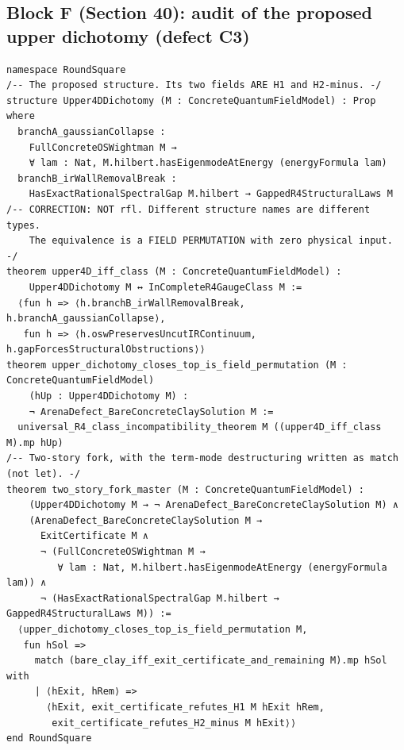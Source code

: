 \documentclass[11pt,a4paper]{article}
\theoremstyle{plain}
\theoremstyle{definition}
\theoremstyle{remark}
\renewcommand{\_}{\oldunderscore\allowbreak}
\begin{document}
\subsection{Block F (Section 40): audit of the proposed upper dichotomy (defect C3)}
\begin{lstlisting}
namespace RoundSquare
/-- The proposed structure. Its two fields ARE H1 and H2-minus. -/
structure Upper4DDichotomy (M : ConcreteQuantumFieldModel) : Prop where
  branchA_gaussianCollapse :
    FullConcreteOSWightman M →
    ∀ lam : Nat, M.hilbert.hasEigenmodeAtEnergy (energyFormula lam)
  branchB_irWallRemovalBreak :
    HasExactRationalSpectralGap M.hilbert → GappedR4StructuralLaws M
/-- CORRECTION: NOT rfl. Different structure names are different types.
    The equivalence is a FIELD PERMUTATION with zero physical input. -/
theorem upper4D_iff_class (M : ConcreteQuantumFieldModel) :
    Upper4DDichotomy M ↔ InCompleteR4GaugeClass M :=
  ⟨fun h => ⟨h.branchB_irWallRemovalBreak, h.branchA_gaussianCollapse⟩,
   fun h => ⟨h.oswPreservesUncutIRContinuum, h.gapForcesStructuralObstructions⟩⟩
theorem upper_dichotomy_closes_top_is_field_permutation (M : ConcreteQuantumFieldModel)
    (hUp : Upper4DDichotomy M) :
    ¬ ArenaDefect_BareConcreteClaySolution M :=
  universal_R4_class_incompatibility_theorem M ((upper4D_iff_class M).mp hUp)
/-- Two-story fork, with the term-mode destructuring written as match (not let). -/
theorem two_story_fork_master (M : ConcreteQuantumFieldModel) :
    (Upper4DDichotomy M → ¬ ArenaDefect_BareConcreteClaySolution M) ∧
    (ArenaDefect_BareConcreteClaySolution M →
      ExitCertificate M ∧
      ¬ (FullConcreteOSWightman M →
         ∀ lam : Nat, M.hilbert.hasEigenmodeAtEnergy (energyFormula lam)) ∧
      ¬ (HasExactRationalSpectralGap M.hilbert → GappedR4StructuralLaws M)) :=
  ⟨upper_dichotomy_closes_top_is_field_permutation M,
   fun hSol =>
     match (bare_clay_iff_exit_certificate_and_remaining M).mp hSol with
     | ⟨hExit, hRem⟩ =>
       ⟨hExit, exit_certificate_refutes_H1 M hExit hRem,
        exit_certificate_refutes_H2_minus M hExit⟩⟩
end RoundSquare
\end{lstlisting}
\end{document}
